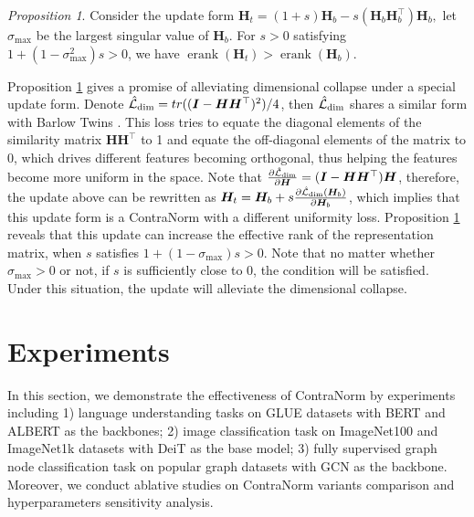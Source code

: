 \documentclass{article}
\def\mH{{\bm{H}}}
\def\mI{{\bm{I}}}
\newcommand{\Ls}{\mathcal{L}}
\theoremstyle{definition}
\theoremstyle{remark}
\theoremstyle{theorem}
\newtheorem{proposition}{Proposition}
\begin{document}
\begin{proposition}
    Consider the update form $
    \mH_t=(1+s)\mH_b-s(\mH_b\mH_b^{\top})\mH_b,$
    let $\sigma_{\max}$ be the largest singular value of $\mH_b$. For $s>0$ satisfying $1+(1-\sigma^2_{\max})s>0$, we have $\operatorname{erank}(\mH_t)>\operatorname{erank}(\mH_b)$.\label{proposition:dimensional}
\end{proposition}
Proposition \ref{proposition:dimensional} gives a promise of alleviating dimensional collapse under a special update form. 
Denote $\hat{\Ls}_{\rm{dim}}=tr((\mI-\mH\mH^{\top})^2)/4$, then $\hat{\Ls}_{\rm{dim}}$ shares a similar form with Barlow Twins \citep{zbontar2021barlow}. This loss tries to equate the diagonal elements of the similarity matrix $\mH\mH^{\top}$ to 1 and equate the off-diagonal elements of the matrix to 0, which drives different features becoming orthogonal, thus helping the features become more uniform in the space. Note that $\frac{\partial \hat{\Ls}_{\rm{dim}}}{\partial \mH}=(\mI-\mH\mH^{\top})\mH$, therefore, the update above can be rewritten as $\mH_t=\mH_b+s\frac{\partial\hat{\Ls}_{\rm{dim}}(\mH_b)}{\partial \mH_b}$, which implies that this update form is a ContraNorm with a different uniformity loss. Proposition \ref{proposition:dimensional} reveals that this update can increase the effective rank of the representation matrix, when $s$ satisfies $1+(1-\sigma_{\max})s>0$. Note that no matter whether $\sigma_{\max}>0$ or not, if $s$ is sufficiently close to $0$, the condition will be satisfied. Under this situation, the update will alleviate the dimensional collapse.


\section{Experiments}
In this section, we demonstrate the effectiveness of ContraNorm by experiments including 1) language understanding tasks on GLUE datasets with BERT and ALBERT \citep{lan2019albert} as the backbones; 2) image classification task on ImageNet100 and ImageNet1k datasets with DeiT as the base model; 3) fully supervised graph node classification task on popular graph datasets with GCN as the backbone. Moreover, we conduct ablative studies on ContraNorm variants comparison and hyperparameters sensitivity analysis.
\end{document}
